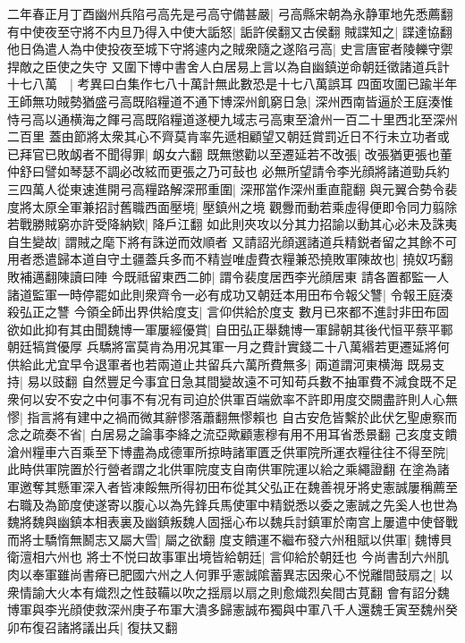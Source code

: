 二年春正月丁酉幽州兵陷弓高先是弓高守備甚嚴|{
	弓高縣宋朝為永静軍地先悉薦翻}
有中使夜至守將不内旦乃得入中使大詬怒|{
	詬許侯翻又古侯翻}
賊諜知之|{
	諜達協翻}
他日偽遣人為中使投夜至城下守將遽内之賊衆隨之遂陷弓高|{
	史言唐宦者陵轢守禦捍敵之臣使之失守}
又圍下博中書舍人白居易上言以為自幽鎮逆命朝廷徵諸道兵計十七八萬　|{
	考異曰白集作七八十萬計無此數恐是十七八萬誤耳}
四面攻圍已踰半年王師無功賊勢猶盛弓高既陷糧道不通下博深州飢窮日急|{
	深州西南皆逼於王庭湊惟恃弓高以通横海之餫弓高既陷糧道遂梗九域志弓高東至滄州一百二十里西北至深州二百里}
蓋由節將太衆其心不齊莫肯率先遞相顧望又朝廷賞罰近日不行未立功者或已拜官已敗衂者不聞得罪|{
	衂女六翻}
既無懲勸以至遷延若不改張|{
	改張猶更張也董仲舒曰譬如琴瑟不調必改絃而更張之乃可鼔也}
必無所望請令李光顔將諸道勁兵約三四萬人從東速進開弓高糧路解深邢重圍|{
	深邢當作深州重直龍翻}
與元翼合勢令裴度將太原全軍兼招討舊職西面壓境|{
	壓鎮州之境}
觀釁而動若乘虛得便即令同力翦除若戰勝賊窮亦許受降納欵|{
	降戶江翻}
如此則夾攻以分其力招諭以動其心必未及誅夷自生變故|{
	謂賊之麾下將有誅逆而效順者}
又請詔光顔選諸道兵精鋭者留之其餘不可用者悉遣歸本道自守土疆蓋兵多而不精豈唯虛費衣糧兼恐撓敗軍陳故也|{
	撓奴巧翻敗補邁翻陳讀曰陣}
今既祗留東西二帥|{
	謂令裴度居西李光顔居東}
請各置都監一人諸道監軍一時停罷如此則衆齊令一必有成功又朝廷本用田布令報父讐|{
	令報王庭湊殺弘正之讐}
今領全師出界供給度支|{
	言仰供給於度支}
數月已來都不進討非田布固欲如此抑有其由聞魏博一軍屢經優賞|{
	自田弘正舉魏博一軍歸朝其後代恒平蔡平鄆朝廷犒賞優厚}
兵驕將富莫肯為用况其軍一月之費計實錢二十八萬緡若更遷延將何供給此尤宜早令退軍者也若兩道止共留兵六萬所費無多|{
	兩道謂河東横海}
既易支持|{
	易以豉翻}
自然豐足今事宜日急其間變故遠不可知苟兵數不抽軍費不減食既不足衆何以安不安之中何事不有况有司迫於供軍百端歛率不許即用度交闕盡許則人心無憀|{
	指言將有建中之禍而微其辭憀落蕭翻無憀賴也}
自古安危皆繫於此伏乞聖慮察而念之疏奏不省|{
	白居易之論事李絳之流亞歟顧憲穆有用不用耳省悉景翻}
己亥度支饋滄州糧車六百乘至下博盡為成德軍所掠時諸軍匱乏供軍院所運衣糧往往不得至院|{
	此時供軍院置於行營者謂之北供軍院度支自南供軍院運以給之乘繩證翻}
在塗為諸軍邀奪其懸軍深入者皆凍餒無所得初田布從其父弘正在魏善視牙將史憲誠屢稱薦至右職及為節度使遂寄以腹心以為先鋒兵馬使軍中精鋭悉以委之憲誠之先奚人也世為魏將魏與幽鎮本相表裏及幽鎮叛魏人固揺心布以魏兵討鎮軍於南宫上屢遣中使督戰而將士驕惰無鬭志又屬大雪|{
	屬之欲翻}
度支饋運不繼布發六州租賦以供軍|{
	魏博貝衛澶相六州也}
將士不悦曰故事軍出境皆給朝廷|{
	言仰給於朝廷也}
今尚書刮六州肌肉以奉軍雖尚書瘠已肥國六州之人何罪乎憲誠隂蓄異志因衆心不悦離間鼓扇之|{
	以衆情諭大火本有熾烈之性鼓鞴以吹之揺扇以扇之則愈熾烈矣間古莧翻}
會有詔分魏博軍與李光顔使救深州庚子布軍大潰多歸憲誠布獨與中軍八千人還魏壬寅至魏州癸卯布復召諸將議出兵|{
	復扶又翻}
